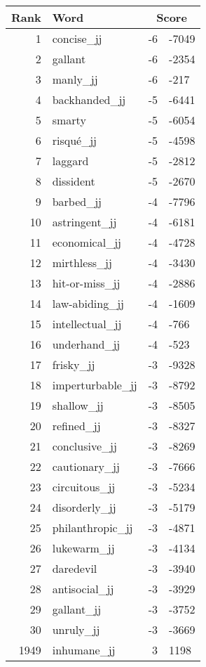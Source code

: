 \begin{longtable}[!htbp]{| rlr@{.}l |}
    \hline
    \textbf{Rank} & \textbf{Word} & \multicolumn{2}{c|}{\textbf{Score}} \\
    \hline
    \endhead
    1 & concise\_jj & -6 & -7049 \\
    2 & gallant & -6 & -2354 \\
    3 & manly\_jj & -6 & -217 \\
    4 & backhanded\_jj & -5 & -6441 \\
    5 & smarty & -5 & -6054 \\
    6 & risqué\_jj & -5 & -4598 \\
    7 & laggard & -5 & -2812 \\
    8 & dissident & -5 & -2670 \\
    9 & barbed\_jj & -4 & -7796 \\
    10 & astringent\_jj & -4 & -6181 \\
    11 & economical\_jj & -4 & -4728 \\
    12 & mirthless\_jj & -4 & -3430 \\
    13 & hit-or-miss\_jj & -4 & -2886 \\
    14 & law-abiding\_jj & -4 & -1609 \\
    15 & intellectual\_jj & -4 & -766 \\
    16 & underhand\_jj & -4 & -523 \\
    17 & frisky\_jj & -3 & -9328 \\
    18 & imperturbable\_jj & -3 & -8792 \\
    19 & shallow\_jj & -3 & -8505 \\
    20 & refined\_jj & -3 & -8327 \\
    21 & conclusive\_jj & -3 & -8269 \\
    22 & cautionary\_jj & -3 & -7666 \\
    23 & circuitous\_jj & -3 & -5234 \\
    24 & disorderly\_jj & -3 & -5179 \\
    25 & philanthropic\_jj & -3 & -4871 \\
    26 & lukewarm\_jj & -3 & -4134 \\
    27 & daredevil & -3 & -3940 \\
    28 & antisocial\_jj & -3 & -3929 \\
    29 & gallant\_jj & -3 & -3752 \\
    30 & unruly\_jj & -3 & -3669 \\
    1949 & inhumane\_jj & 3 & 1198 \\

\end{longtable}
